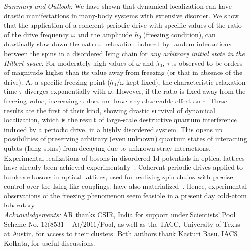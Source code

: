 \documentclass[reprint,preprintnumbers,showpacs,amsmath,twocolumn,showkeys,aps,prl]{revtex4-1}
\begin{document}
\noindent
{\it Summary and Outlook:}
We have shown that dynamical localization can have drastic manifestations in many-body systems with
extensive disorder. We show that the application of a coherent periodic drive with specific values of the ratio 
of the drive frequency $\omega$ and the amplitude $h_{0}$ (freezing condition), can drastically slow 
down the natural relaxation induced by random interactions between the spins in a disordered Ising chain
for {\it any arbitrary initial state in the Hilbert space}. 
For moderately high values of $\omega$ and $h_{0}$, $\tau$ is observed to be orders of magnitude higher 
than its value away from freezing (or that in absence of the drive). At a specific freezing point 
($h_{0}/\omega$ kept fixed), the characteristic relaxation time $\tau$ diverges exponentially with 
$\omega$. However, if the ratio is fixed away from the freezing value, increasing $\omega$
does not have any observable effect on $\tau.$ These results are the first of their kind, showing drastic survival of 
dynamical localization, which is the result of large-scale destructive quantum interference induced by a 
periodic drive, in a highly disordered system. This opens up possibilities of preserving arbitrary (even unknown) 
quantum states of interacting qubits (Ising spins) from decaying due to unknown stray interactions.   
Experimental realizations of bosons in disordered 1d potentials in optical lattices have already been achieved 
experimentally~\cite{Disordered-Bosons,Bloch-Nat-Phys}. Coherent periodic drives applied to hardcore bosons
in optical lattices, used for realizing spin chains with precise control over the Ising-like
couplings, have also materialized~\cite{Bloch-Periodic}.
Hence, experimental observations of the freezing phenomenon seem feasible 
in a present day cold-atom laboratory.       \\
\noindent
{\it Acknowledgements:}
AR thanks CSIR, India for support under Scientists' Pool Scheme No. $13(8531-$A$)/2011/$Pool, as well as the TACC, University 
of Texas at Austin, for access to their clusters. Both authors thank Kasturi Basu, IACS Kolkata, for useful 
discussions.


 
 
\end{document}
